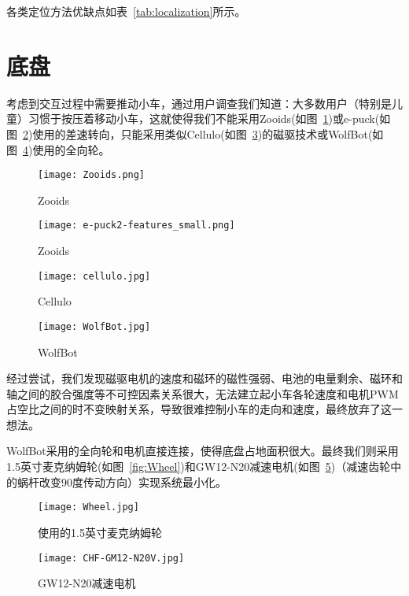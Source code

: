 
各类定位方法优缺点\cite{ozgur2018cellulo}如表~\ref{tab:localization}所示。

\section{底盘}
考虑到交互过程中需要推动小车，通过用户调查我们知道：大多数用户（特别是儿童）习惯于按压着移动小车，这就使得我们不能采用Zooids\cite{le2016zooids}(如图~\ref{fig:Zooids})或e-puck\cite{mondada2009puck}(如图~\ref{fig:e-puck})使用的差速转向，只能采用类似Cellulo\cite{ozgur2017cellulo}(如图~\ref{fig:Cellulo})的磁驱技术或WolfBot\cite{betthauser2014wolfbot}(如图~\ref{fig:WolfBot})使用的全向轮。

\begin{figure}[htbp]
    \centering
    \texttt{[image: Zooids.png]}
    \caption{Zooids}
    \label{fig:Zooids}
\end{figure}

\begin{figure}[htbp]
    \centering
    \texttt{[image: e-puck2-features\_small.png]}
    \caption{Zooids}
    \label{fig:e-puck}
\end{figure}

\begin{figure}[htbp]
    \centering
    \texttt{[image: cellulo.jpg]}
    \caption{Cellulo}
    \label{fig:Cellulo}
\end{figure}
  
\begin{figure}[htbp]
    \centering
    \texttt{[image: WolfBot.jpg]}
    \caption{WolfBot}
    \label{fig:WolfBot}
\end{figure}

经过尝试，我们发现磁驱电机的速度和磁环的磁性强弱、电池的电量剩余、磁环和轴之间的胶合强度等不可控因素关系很大，无法建立起小车各轮速度和电机PWM占空比之间的时不变映射关系，导致很难控制小车的走向和速度，最终放弃了这一想法。

WolfBot采用的全向轮和电机直接连接，使得底盘占地面积很大。最终我们则采用1.5英寸麦克纳姆轮(如图~\ref{fig:Wheel})和GW12-N20减速电机(如图~\ref{fig:GM12})（减速齿轮中的蜗杆改变90度传动方向）实现系统最小化。

\begin{figure}
    \begin{minipage}{0.48\textwidth}
      \centering
      \texttt{[image: Wheel.jpg]}
      \caption{使用的1.5英寸麦克纳姆轮}
      \label{fig:Wheel}
    \end{minipage}\hfill
    \begin{minipage}{0.48\textwidth}
      \centering
      \texttt{[image: CHF-GM12-N20V.jpg]}
      \caption{GW12-N20减速电机}
      \label{fig:GM12}
    \end{minipage}
\end{figure}

